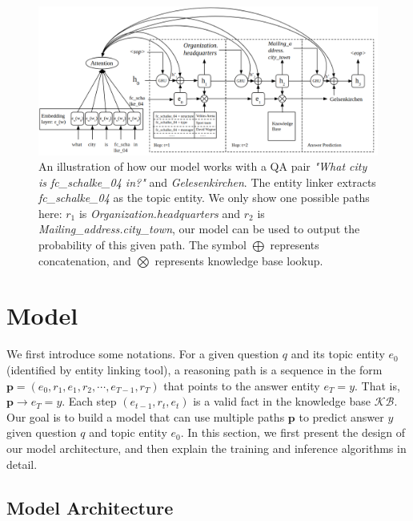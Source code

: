 \begin{figure}[t]\centering
\includegraphics[width=2.0\columnwidth]{figs/model.png}
\caption{\fontsize{10}{12}\selectfont An illustration of how our model works with a QA pair \textit{"What city is fc\_schalke\_04 in?"} and \textit{Gelesenkirchen}. The entity linker extracts \textit{fc\_schalke\_04} as the topic entity. We only show one possible paths here: $r_1$ is \textit{Organization.headquarters} and $r_2$ is \textit{Mailing\_address.city\_town}, our model can be used to output the probability of this given path. The symbol $\bigoplus$ represents concatenation, and $\bigotimes$ represents knowledge base lookup. }
\label{fig:model}
\end{figure}


\section{Model}
We first introduce some notations. For a given question $q$ and its topic entity $e_0$ (identified by entity linking tool), a reasoning path is a sequence in the form $\mathbf{p} = (e_0, r_{1},e_{1},r_{2}, \cdots,e_{T-1}, r_{T})$ that points to the answer entity $e_T=y$. That is, $\mathbf{p}\rightarrow e_T=y$. Each step $(e_{t-1},r_t,e_t)$ is a valid fact in the knowledge base $\mathcal{KB}$. Our goal is to build a model that can use multiple paths $\mathbf{p}$ to predict answer $y$ given question $q$ and topic entity $e_0$. In this section, we first present the design of our model architecture, and then explain the training and inference algorithms in detail. 

\subsection{Model Architecture}





